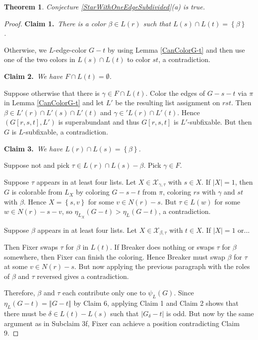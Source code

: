 \documentclass[12pt]{article}
\theoremstyle{plain}
\newtheorem{thm}{Theorem}[section]
\theoremstyle{definition}
\theoremstyle{remark}
\newcommand{\fancy}[1]{\mathcal{#1}}
\newcommand{\set}[1]{\left\{ #1 \right\}}
\newcommand{\card}[1]{\left|#1\right|}
\newcommand{\size}[1]{\left\Vert#1\right\Vert}
\def\X{\fancy{X}}
\newcommand{\claim}[2]{{\bf Claim #1.}~{\it #2}~~}
\begin{document}
	\begin{thm}
		Conjecture \ref{StarWithOneEdgeSubdivided}(a) is true.
	\end{thm}
	\begin{proof}
		\claim{1}{There is a color $\beta \in L(r)$ such that $L(s) \cap L(t) = \set{\beta}$.}
		
		Otherwise, we $L$-edge-color $G-t$ by using Lemma \ref{CanColorG-t} and then use one of the two colors in $L(s) \cap L(t)$ to color $st$, a contradiction.
		
		\claim{2}{We have $F \cap L(t) = \emptyset$.}
		
		Suppose otherwise that there is $\gamma \in F \cap L(t)$.  Color the edges of $G - s - t$ via $\pi$ in Lemma \ref{CanColorG-t} and let $L'$ be the resulting list assignment on $rst$.  Then $\beta \in L'(r) \cap L'(s) \cap L'(t)$ and $\gamma \in 'L(r) \cap L'(t)$.  Hence $(G[r,s,t], L')$ is superabundant and thus $G[r,s,t]$ is $L'$-subfixable.  But then $G$ is $L$-subfixable, a contradiction.
		
		\claim{3}{We have $L(r) \cap L(s) = \set{\beta}$.}
		
			Suppose not and pick $\tau \in L(r) \cap L(s) - \beta$. Pick $\gamma \in F$. 
			
			Suppose $\tau$ appears in at least four lists. Let $X \in \X_{\gamma, \tau}$ with $s \in X$.  If $|X| = 1$, then $G$ is colorable from $L_X$ by coloring $G - s - t$ from $\pi$, coloring $rs$ with $\gamma$ and $st$ with $\beta$.
			Hence $X = \set{s,v}$ for some $v \in N(r) - s$.  But $\tau \in L(w)$ for some $w \in N(r) - s - v$, so $\eta_{L_X}(G-t) > \eta_L(G-t)$, a contradiction. 
			
			Suppose $\beta$ appears in at least four lists. Let $X \in \X_{\beta, \tau}$ with $t \in X$.  If $|X| = 1$ or...
			
			Then Fixer swaps $\tau$ for $\beta$ in $L(t)$.  If Breaker does nothing or swaps $\tau$ for $\beta$ somewhere, then Fixer can finish the coloring.  Hence Breaker must swap $\beta$ for $\tau$ at some $v \in N(r) - s$.  But now applying the previous paragraph with the roles of $\beta$ and $\tau$ reversed gives a contradiction.
			
			Therefore, $\beta$ and $\tau$ each contribute only one to $\psi_L(G)$. Since $\eta_L(G-t) = \size{G-t}$ by Claim 6, applying Claim 1 and Claim 2 shows that there must be $\delta \in L(t) - L(s)$ such that $\card{G_\delta - t}$ is odd.  But now by the same argument as in Subclaim 3f, Fixer can achieve a position contradicting Claim 9.
			

\end{proof}
\end{document}
